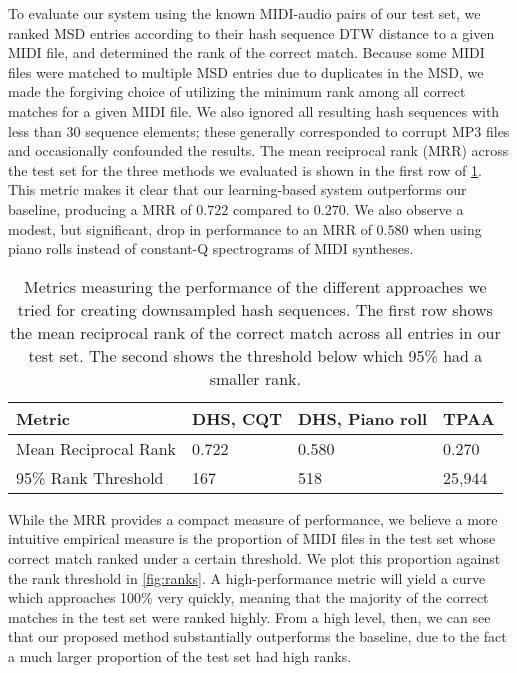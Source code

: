 To evaluate our system using the known MIDI-audio pairs of our test set, we ranked MSD entries according to their hash sequence DTW distance to a given MIDI file, and determined the rank of the correct match.
Because some MIDI files were matched to multiple MSD entries due to duplicates in the MSD, we made the forgiving choice of utilizing the minimum rank among all correct matches for a given MIDI file.
We also ignored all resulting hash sequences with less than 30 sequence elements; these generally corresponded to corrupt MP3 files and occasionally confounded the results.
The mean reciprocal rank (MRR) across the test set for the three methods we evaluated is shown in the first row of \cref{tab:ranking_metrics}.
This metric makes it clear that our learning-based system outperforms our baseline, producing a MRR of $0.722$ compared to $0.270$.
We also observe a modest, but significant, drop in performance to an MRR of $0.580$ when using piano rolls instead of constant-Q spectrograms of MIDI syntheses.

\begin{table}
  \begin{center}
    \begin{tabular}{l l l l}
      \toprule
      Metric & \textbf{DHS, CQT} & \textbf{DHS, Piano roll} & \textbf{TPAA} \\
      \midrule
      Mean Reciprocal Rank & 0.722 & 0.580 & 0.270 \\
      95\% Rank Threshold & 167 & 518 & 25,944 \\
      \bottomrule
    \end{tabular}
  \end{center}
  \caption{Metrics measuring the performance of the different approaches we tried for creating downsampled hash sequences.
The first row shows the mean reciprocal rank of the correct match across all entries in our test set.
The second shows the threshold below which 95\% had a smaller rank.}
  \label{tab:ranking_metrics}
\end{table}

While the MRR provides a compact measure of performance, we believe a more intuitive empirical measure is the proportion of MIDI files in the test set whose correct match ranked under a certain threshold.
We plot this proportion against the rank threshold in \cref{fig:ranks}.
A high-performance metric will yield a curve which approaches 100\% very quickly, meaning that the majority of the correct matches in the test set were ranked highly.
From a high level, then, we can see that our proposed method substantially outperforms the baseline, due to the fact a much larger proportion of the test set had high ranks.

